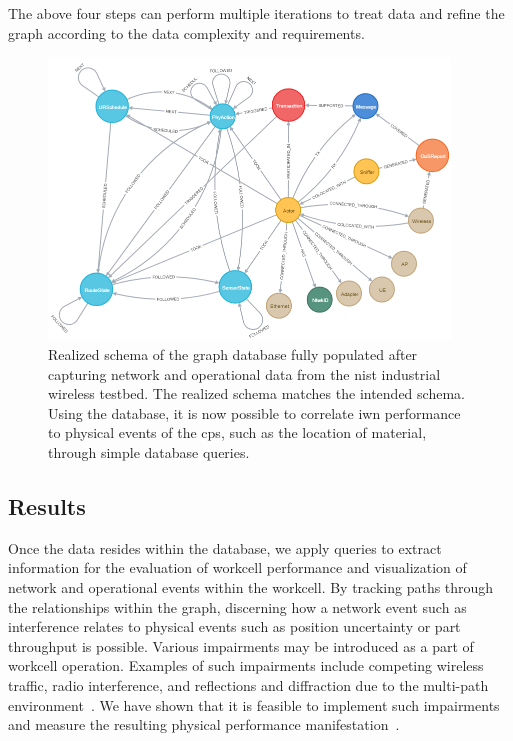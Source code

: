 The above four steps can perform multiple iterations to treat data and refine the graph according to the data complexity and requirements.  
%
\begin{figure}
	\centering
	\includegraphics[width=0.95\textwidth]{chapter-gdb-appl/figures/database/graph_schema_updated_2.png}
	\caption{Realized schema of the graph database fully populated after capturing network and operational data from the \gls{nist} industrial wireless testbed.  The realized schema matches the intended schema.  Using the database, it is now possible to correlate \gls{iwn} performance to physical events of the \gls{cps}, such as the location of material, through simple database queries.}
	\label{gdbappl:fig:real-schema}
\end{figure}

\subsection{Results} \label{gdbappl:sec:results}

Once the data resides within the database, we apply queries to extract information for the evaluation of workcell performance and visualization of network and operational events within the workcell. By tracking paths through the relationships within the graph, discerning how a network event such as interference relates to physical events such as position uncertainty or part throughput is possible. Various impairments may be introduced as a part of workcell operation.  Examples of such impairments include competing wireless traffic, radio interference, and reflections and diffraction due to the multi-path environment~\cite{Candell2017.NIST1951}. We have shown that it is feasible to implement such impairments and measure the resulting physical performance manifestation~\cite{Liu2019vancouver}. 


